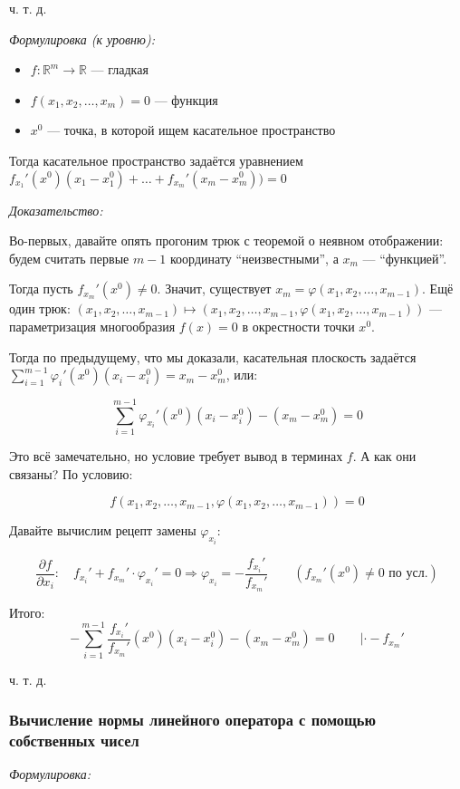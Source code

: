 \documentclass{article}
\begin{document}
ч. т. д.

\textit{Формулировка (к уровню):}

\begin{itemize}
    \item $f: \mathbb{R}^m \rightarrow \mathbb{R}$ --- гладкая
    \item $f(x_1, x_2, \ldots, x_m) = 0$ --- функция
    \item $x^0$ --- точка, в которой ищем касательное пространство
\end{itemize}

Тогда касательное пространство задаётся уравнением $f_{x_1}'(x^0)(x_1 - x^0_1) + \ldots + f_{x_m}'(x_m - x^0_m)) = 0$

\textit{Доказательство:}

Во-первых, давайте опять прогоним трюк с теоремой о неявном отображении: будем считать первые $m - 1$ координату ``неизвестными'', а $x_m$ --- ``функцией''.

Тогда пусть $f_{x_m}'(x^0) \neq 0$. Значит, существует $x_m = \varphi(x_1, x_2, \ldots, x_{m - 1})$. Ещё один трюк: $(x_1, x_2, \ldots, x_{m - 1}) \mapsto (x_1, x_2, \ldots, x_{m - 1}, \varphi(x_1, x_2, \ldots, x_{m - 1}))$ --- параметризация многообразия $f(x) = 0$ в окрестности точки $x^0$.

Тогда по предыдущему, что мы доказали, касательная плоскость задаётся $\sum_{i = 1}^{m - 1} \varphi_i'(x^0)(x_i - x^0_i) = x_m - x^0_m$, или:

\[\sum_{i = 1}^{m - 1} \varphi_{x_i}'(x^0)(x_i - x^0_i) - (x_m - x^0_m) = 0\]

Это всё замечательно, но условие требует вывод в терминах $f$. А как они связаны? По условию:

\[f(x_1, x_2, \ldots, x_{m - 1}, \varphi(x_1, x_2, \ldots, x_{m - 1})) = 0\]

Давайте вычислим рецепт замены $\varphi_{x_i}$:

\[\frac{\partial f}{\partial x_i}: \quad f_{x_i}' + f_{x_m}' \cdot \varphi_{x_i}' = 0 \Rightarrow \varphi_{x_i} = - \frac{f_{x_i}'}{f_{x_m}'} \qquad \left(f_{x_m}'(x^0) \neq 0 \text{ по усл.}\right)\]

Итого:
\[-\sum_{i = 1}^{m - 1} \frac{f_{x_i}'}{f_{x_m}'}(x^0)(x_i - x^0_i) - (x_m - x^0_m) = 0 \qquad | \cdot -f_{x_m}'\]

ч. т. д.

\subsubsection{Вычисление нормы линейного оператора с помощью собственных чисел}
\textit{Формулировка:}
\end{document}
